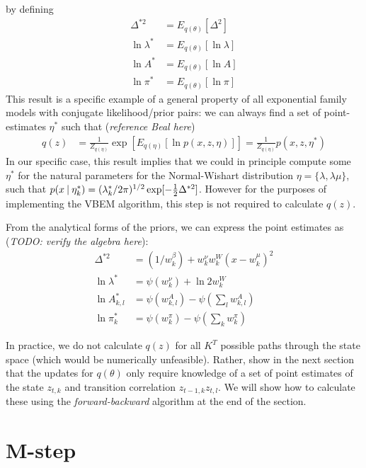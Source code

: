 by defining
\begin{align}
  \Delta^{*2} &= E_{q(\theta)} [ \Delta^2] \\
  \ln \lambda^* &= E_{q(\theta)} [ \ln \lambda ] \\
  \ln A^* &= E_{q(\theta)} [ \ln A ] \\
  \ln \pi^* &= E_{q(\theta)} [ \ln \pi ]
\end{align}
This result is a specific example of a general property of all exponential family models with conjugate likelihood/prior pairs: we can always find a set of point-estimates $\eta^*$ such that
(\emph{reference Beal here})
\begin{align}
 q(z) &= \frac{1}{Z_{q(\eta)}} \exp[E_{q(\eta)} [\ln p(x, z, \eta) ]] = \frac{1}{Z_{q(\eta)}} p(x, z, \eta^*)
\end{align}
In our specific case, this result implies that we could in principle compute some $\eta^*$ for the natural parameters for the Normal-Wishart distribution $\eta = \{ \lambda, \lambda \mu \}$, such that $p(x \:|\: \eta^*_k) = (\lambda^*_k/2 \pi)^{1/2} \exp[-\tfrac{1}{2}\Delta^{*2}]$. However for the purposes of implementing the VBEM algorithm, this step is not required to calculate $q(z)$.

From the analytical forms of the priors, we can express the point estimates as (\emph{TODO: verify the algebra here}):
\begin{align}
  \Delta^{*2} &= 
  (1/w^\beta_k)
  + 
  w^\nu_k w^W_k (x - w^\mu_k)^2 \\
  \ln \lambda^* &= \psi (w^\nu_k) + \ln 2 w^W_k\\
  \ln A_{k,l}^* &= \psi \left( w^A_{k,l} \right) - \psi \left( \sum_l w^A_{k,l} \right)\\
  \ln \pi_{k}^* &= \psi \left( w^\pi_{k} \right) - \psi \left( \sum_k w^\pi_{k} \right)
\end{align}

In practice, we do not calculate $q(z)$ for all $K^T$ possible paths through the state space (which would be numerically unfeasible). Rather, show in the next section that the updates for $q(\theta)$ only require knowledge of a set of point estimates of the state $z_{t,k}$ and transition correlation $z_{t-1,k}z_{t,l}$. We will show how to calculate these using the \emph{forward-backward} algorithm at the end of the section.

\section{M-step} 

